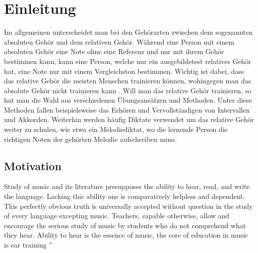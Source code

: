 \begin{abstract}
    
\end{abstract}



\chapter{Einleitung}
Im allgemeinen unterscheidet man bei den Gehörarten zwischen dem sogenannten absoluten Gehör und dem relativen Gehör. Während eine Person mit einem absoluten Gehör eine Note ohne eine Referenz und nur mit ihrem Gehör bestimmen kann, kann eine Person, welche nur ein ausgebildetest relatives Gehör hat, eine Note nur mit einem Vergleichston bestimmen. Wichtig ist dabei, dass das relative Gehör die meisten Menschen trainieren können, wohingegen man das absolute Gehör nicht trainieren kann \cite{gussmack2006latentes}. Will man das relative Gehör trainieren, so hat man die Wahl aus verschiedenen Übungsansätzen und Methoden. Unter diese Methoden fallen beispielsweise das Erhören und Vervollständigen von Intervallen und Akkorden. Weiterhin werden häufig Diktate verwendet um das relative Gehör weiter zu schulen, wie etwa ein Melodiediktat, wo die lernende Person die richtigen Noten der gehörten Melodie aufschreiben muss. 

\section{Motivation}
\glqq 
Study of music and
its literature presupposes the ability to hear,
read, and write the language. Lacking this ability one is
comparatively helpless and dependent. This perfectly
obvious truth is universally accepted without question
in the study of every language excepting music. Teachers, capable otherwise, allow and encourage the serious
study of music by students who do not comprehend what
they hear. Ability to hear is the essence of music, the
core of education in music is ear training
''  \cite{spencer1947ear}

